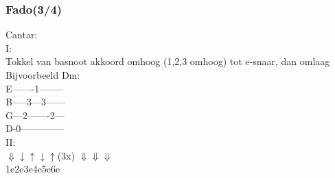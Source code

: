 \subsubsection*{Fado(3/4)}
Cantar:\\
I:\\
Tokkel van basnoot akkoord omhoog (1,2,3 omhoog) tot e-snaar, dan omlaag\\
Bijvoorbeeld Dm: \\
E-------1--------\\
B-----3---3------\\
G---2-------2---\\
D-0--------------\\
II:\\
$\Downarrow$\hspace{2em}\hphantom{$\uparrow$}\hspace{2em}$\downarrow$\hspace{2em}$\uparrow$\hspace{2.1em}$\downarrow$\hspace{2em}$\uparrow$\hspace{1em}(3x) \hspace{2.1em}$\Downarrow$\hspace{2em}\hphantom{$\uparrow$}\hspace{2em}$\Downarrow$\hspace{2em}\hphantom{$\uparrow$}\hspace{2em}$\Downarrow$\hspace{2em}\\
1\hspace{2em}e\hspace{2em}2\hspace{2em}e\hspace{2em}3\hspace{2em}e\hspace{5em}4\hspace{2em}e\hspace{2em}5\hspace{2em}e\hspace{2em}6\hspace{2em}e\\


